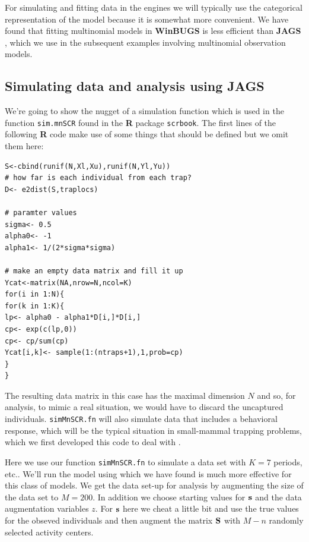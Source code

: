 For simulating and fitting data in the \bugs engines we will typically use
the categorical representation of the model because it is somewhat
more convenient.  We have found that fitting multinomial models in
{\bf WinBUGS} is less efficient than {\bf JAGS}
\citep{converse_royle:2013}, which we use in the subsequent examples
involving multinomial 
observation models.



\subsection{Simulating data and analysis using JAGS}

We're going to show the nugget of a simulation function which is
used in the function \mbox{\tt sim.mnSCR} found in the {\bf R} package
\mbox{\tt scrbook}.  The first lines of the following {\bf R} code
make use of some things that should be defined but we omit them here:
{\small
\begin{verbatim}
S<-cbind(runif(N,Xl,Xu),runif(N,Yl,Yu))
# how far is each individual from each trap?
D<- e2dist(S,traplocs)

# paramter values
sigma<- 0.5
alpha0<- -1
alpha1<- 1/(2*sigma*sigma)

# make an empty data matrix and fill it up
Ycat<-matrix(NA,nrow=N,ncol=K)
for(i in 1:N){
for(k in 1:K){
lp<- alpha0 - alpha1*D[i,]*D[i,]
cp<- exp(c(lp,0))
cp<- cp/sum(cp)
Ycat[i,k]<- sample(1:(ntraps+1),1,prob=cp)
}
}
\end{verbatim}
}
The resulting data matrix in this case has the maximal dimension $N$
and so, for analysis, to mimic a real situation, we would have to
discard the uncaptured individuals.  \mbox{\tt simMnSCR.fn} will also
simulate data that includes a behavioral response, which will be the
typical situation in small-mammal trapping problems, which we first
developed this code to deal with \citep[see][for
details]{converse_royle:2012}.

Here we use our function \mbox{\tt simMnSCR.fn} to simulate a data set
with $K=7$ periods, etc.. We'll run the model using \jags which
we have found is much more effective for this class of models.  We get
the data set-up for analysis by augmenting the size of the data set to
$M=200$. In addition we choose starting values for ${\bf s}$ and the
data augmentation variables $z$.  For ${\bf s}$ here we cheat a little
bit and use the true values for the obseved individuals and then
augment the matrix ${\bf S}$ with $M-n$ randomly selected activity
centers.

